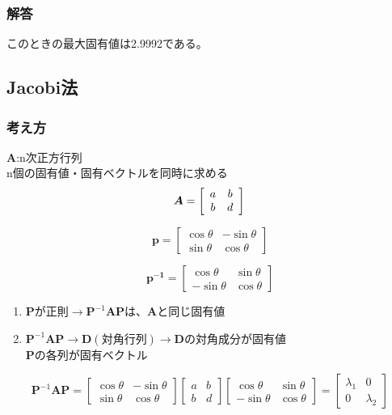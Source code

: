 \documentclass[a4j,twoside,openright,11pt]{jsarticle}
\begin{document}
\subsubsection{解答}
このときの最大固有値は2.9992である。
\subsection{Jacobi法}
\subsubsection{考え方}
$\bm{A}$:n次正方行列\\
n個の固有値・固有ベクトルを同時に求める
\begin{equation}
\bm{A} = \left[
\begin{array}{cc}
a & b\\
b & d
\end{array}
\right]\\
\end{equation}

\begin{equation}
\bm{p} = \left[
\begin{array}{cc}
\cos \theta & -\sin \theta \\
\sin \theta & \cos \theta
\end{array}
\right]
\end{equation}

\begin{equation}
\bm{p^{-1}} = \left[
\begin{array}{cc}
\cos \theta & \sin \theta \\
-\sin \theta & \cos \theta
\end{array}
\right]
\end{equation}

\begin{enumerate}
\item $\bm{P}$が正則$\rightarrow \bm{P}^{-1}\bm{A}\bm{P}$は、$\bm{A}$と同じ固有値
\item $\bm{P}^{-1}\bm{A}\bm{P} \rightarrow \bm{D}(対角行列) \rightarrow \bm{D}の対角成分が固有値$\\
$\bm{P}$の各列が固有ベクトル
\end{enumerate}

\begin{equation}
\bm{P}^{-1}\bm{A}\bm{P} = 
\left[
\begin{array}{cc}
\cos \theta & -\sin \theta \\
\sin \theta & \cos \theta
\end{array}
\right]
\left[
\begin{array}{cc}
a & b \\
b & d
\end{array}
\right]
\left[
\begin{array}{cc}
\cos \theta &  \sin \theta \\
-\sin \theta & \cos \theta
\end{array}
\right]=
\left[
\begin{array}{cc}
\lambda_1&0\\
0&\lambda_2
\end{array}
\right]
\end{equation}
\end{document}
